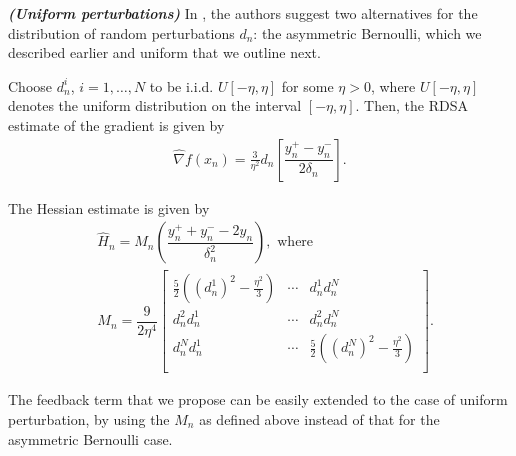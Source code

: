 \documentclass[letterpaper, 10 pt, conference]{ieeeconf}  %
\begin{document}
\begin{remark}\textbf{\textit{(Uniform perturbations)}}
In \cite{prashanth2015rdsa}, the authors suggest two alternatives for the distribution of random perturbations $d_n$: the asymmetric Bernoulli, which we described earlier and uniform that we outline next.

Choose $d_n^i$, $ i=1,\ldots,N$ to be i.i.d. $U[-\eta,\eta]$ for some $\eta>0$, where $U[-\eta,\eta]$ denotes the uniform distribution on the interval $[-\eta,\eta]$.
Then, the RDSA estimate of the gradient is given by
\begin{align}
\label{eq:grad-unif}
\widehat\nabla f(x_n) = \frac3{\eta^2} d_n \left[ \dfrac{y_n^+ - y_n^-}{2\delta_n}\right].
\end{align}

The Hessian estimate is given by
\begin{align}
\label{eq:2rdsa-estimate-unif}
&\widehat H_n =  M_n \left(\dfrac{y_n^+ + y_n^- - 2 y_n}{\delta_n^2}\right), \text{ where } \\
& M_n =
\dfrac{9}{2\eta^4}\left[
\begin{array}{cccc}
\frac{5}{2}\left((d_n^1)^2-\frac{\eta^2}{3}\right) & \cdots & d_n^1 d_n^N\\
d_n^2 d_n^1  &  \cdots & d_n^2 d_n^N\\
d_n^N d_n^1 & \cdots &  \frac{5}{2}\left((d_n^N)^2-\frac{\eta^2}{3}\right) \\
\end{array}
\right].\nonumber
\end{align}

The feedback term that we propose can be easily extended to the case of uniform perturbation, by using the $M_n$ as defined above instead of that for the asymmetric Bernoulli case.
\end{remark}
\end{document}
